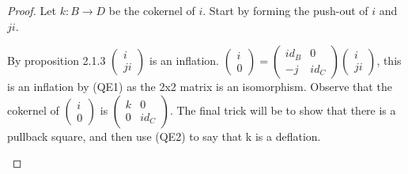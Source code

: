     \begin{proof}
        Let $k:B\rightarrow D$ be the cokernel of $i$. Start by forming the push-out of $i$ and $ji$.
        \begin{center}
        \end{center}
        By proposition 2.1.3 $\begin{pmatrix}
            i \\ ji
        \end{pmatrix}$ is an inflation. $\begin{pmatrix}
            i \\ 0
        \end{pmatrix}=\begin{pmatrix}
            id_B & 0 \\ -j & id_C
        \end{pmatrix}\begin{pmatrix}
            i \\ ji
        \end{pmatrix}$, this is an inflation by (QE1) as the 2x2 matrix is an isomorphism. Observe that the cokernel of $\begin{pmatrix} i \\ 0 \end{pmatrix}$ is $\begin{pmatrix}
            k & 0 \\ 0 & id_C
        \end{pmatrix}$. The final trick will be to show that there is a pullback square, and then use (QE2) to say that k is a deflation.
        \begin{center}
\end{center}
\end{proof}
